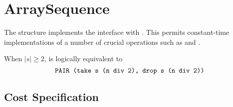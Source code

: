 \chapter{ArraySequence}
\label{ch:array-seq}
\begin{preamble}
The  structure implements the  interface
with . This permits constant-time
implementations of a number of crucial operations such as  and
.
\end{preamble}

\begin{gram}
When $|s| \geq 2$,  is logically equivalent to
\[
  \texttt{PAIR (take s (n div 2), drop s (n div 2))}
\]
\end{gram}


\section{Cost Specification}

